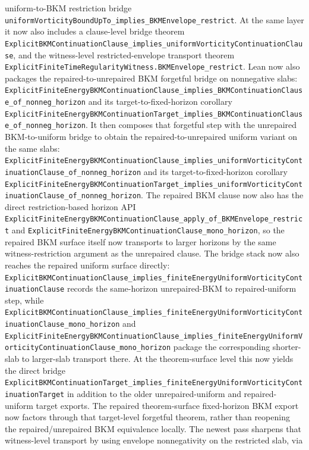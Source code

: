 \documentclass[11pt]{article}
\begin{document}
uniform-to-BKM restriction bridge
\texttt{uniformVorticityBoundUpTo\_implies\_BKMEnvelope\_restrict}.  At the same
layer it now also includes a clause-level bridge theorem
\texttt{ExplicitBKMContinuationClause\_implies\_uniformVorticityContinuationClause},
and the witness-level restricted-envelope transport theorem
\texttt{ExplicitFiniteTimeRegularityWitness.BKMEnvelope\_restrict}.  Lean now
also packages the repaired-to-unrepaired BKM forgetful bridge on
nonnegative slabs:
\texttt{ExplicitFiniteEnergyBKMContinuationClause\_implies\_BKMContinuationClause\_of\_nonneg\_horizon}
and its target-to-fixed-horizon corollary
\texttt{ExplicitFiniteEnergyBKMContinuationTarget\_implies\_BKMContinuationClause\_of\_nonneg\_horizon}.
It then composes that forgetful step with the unrepaired BKM-to-uniform bridge
to obtain the repaired-to-unrepaired uniform variant on the same slabs:
\texttt{ExplicitFiniteEnergyBKMContinuationClause\_implies\_uniformVorticityContinuationClause\_of\_nonneg\_horizon}
and its target-to-fixed-horizon corollary
\texttt{ExplicitFiniteEnergyBKMContinuationTarget\_implies\_uniformVorticityContinuationClause\_of\_nonneg\_horizon}.
The repaired BKM clause now also has the direct restriction-based horizon API
\texttt{ExplicitFiniteEnergyBKMContinuationClause\_apply\_of\_BKMEnvelope\_restrict}
and
\texttt{ExplicitFiniteEnergyBKMContinuationClause\_mono\_horizon},
so the repaired BKM surface itself now transports to larger horizons by the
same witness-restriction argument as the unrepaired clause.
The bridge stack now also reaches the repaired uniform surface directly:
\texttt{ExplicitBKMContinuationClause\_implies\_finiteEnergyUniformVorticityContinuationClause}
records the same-horizon unrepaired-BKM to repaired-uniform step, while
\texttt{ExplicitBKMContinuationClause\_implies\_finiteEnergyUniformVorticityContinuationClause\_mono\_horizon}
and
\texttt{ExplicitFiniteEnergyBKMContinuationClause\_implies\_finiteEnergyUniformVorticityContinuationClause\_mono\_horizon}
package the corresponding shorter-slab to larger-slab transport there.  At the
theorem-surface level this now yields the direct bridge
\texttt{ExplicitBKMContinuationTarget\_implies\_finiteEnergyUniformVorticityContinuationTarget}
in addition to the older unrepaired-uniform and repaired-uniform target exports.
The repaired theorem-surface fixed-horizon BKM export now factors through that
target-level forgetful theorem, rather than reopening the repaired/unrepaired
BKM equivalence locally.
The newest pass sharpens that witness-level transport by using envelope nonnegativity on
the restricted slab, via
\end{document}
